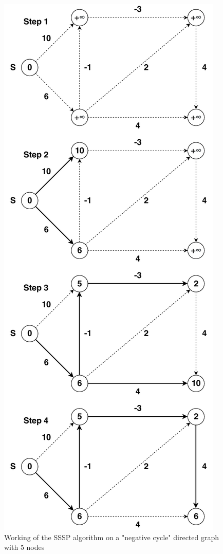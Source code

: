 \documentclass[journal,twoside,web]{ieeecolor}
\begin{document}
\begin{figure}[!h]
    \centerline{\includegraphics[scale=0.5]{figures/sssp.pdf}}
    \caption{Working of the SSSP algorithm on a "negative cycle" directed graph with 5 nodes}
    \label{fig2}
\end{figure}
\end{document}
